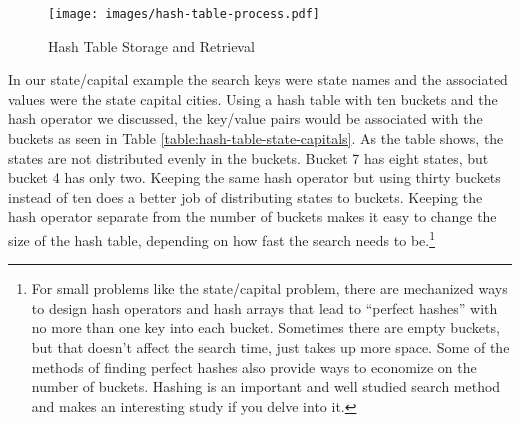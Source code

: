 \begin{figure}
\begin{center}
\texttt{[image: images/hash-table-process.pdf]}
\end{center}
\caption{Hash Table Storage and Retrieval}
\label{fig:hash-table-process}
\end{figure}

In our state/capital example the search keys were state names and the
associated values were the state capital cities.
Using a hash table with ten buckets and the hash operator
we discussed, the key/value pairs would be associated with the
buckets as seen in Table \ref{table:hash-table-state-capitals}.
As the table shows, the states are not distributed evenly in the
buckets. Bucket 7 has
eight states, but bucket 4 has only two.
Keeping the same hash operator but using thirty buckets
instead of ten does a better job of distributing states to buckets.
Keeping the hash operator separate from the number of buckets
makes it easy to change the size of the
hash table, depending on how fast the search needs
to be.\footnote{For small problems like the state/capital problem,
there are mechanized ways to design hash operators and
hash arrays that lead to ``perfect hashes'' with no
more than one key into each bucket. Sometimes there are
empty buckets, but that doesn't affect the search time,
just takes up more space. Some of the methods of
finding perfect hashes also provide ways to economize
on the number of buckets.
Hashing is an important and well studied search method
and makes an interesting study if you delve into it.}

